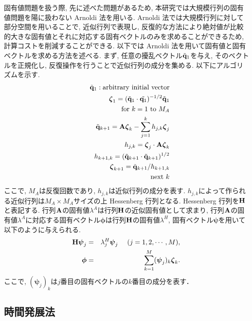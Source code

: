 固有値問題を扱う際,
先に述べた問題があるため,
本研究では大規模行列の固有値問題を陽に扱わない Arnoldi 法を用いる.
Arnoldi 法では大規模行列に対して部分空間を用いることで,
近似行列で表現し,
反復的な方法により絶対値が比較的大きな固有値とそれに対応する固有ベクトルのみを求めることができるため,
計算コストを削減することができる.
以下では Arnoldi 法を用いて固有値と固有ベクトルを求める方法を述べる.
まず,
任意の擾乱ベクトル$\tilde{\bf q}_1$を与え,
そのベクトルを正規化し,
反復操作を行うことで近似行列の成分を集める.
以下にアルゴリズムを示す.
\begin{eqnarray}
  &&\tilde{{\bf q}}_1 : {\rm arbitrary~initial~vector} \nonumber \\ 
  &&{\boldsymbol \zeta}_1=(\tilde{{\bf q}}_1 \cdot \tilde{{\bf q}_1})^{-1/2} \tilde{{\bf q}}_1 \\
  &&{\rm for}~k=1~{\rm to}~M_{A}  \nonumber \\ 
  &&~~\tilde{{\bf q}}_{k+1} = {\bf A}{\mbox {\boldmath $\zeta$}}_k - \sum_{j=1}^k h_{j,k} {\mbox {\boldmath $\zeta$}}_j \\
  &&~~h_{j,k} ={\mbox {\boldmath $\zeta$}}_j \cdot {\bf A}{\mbox {\boldmath $\zeta$}}_k \\
  &&~~h_{k+1,k}=(\tilde{{\bf q}}_{k+1} \cdot \tilde{{\bf q}}_{k+1})^{1/2} \\
  &&~~{\mbox {\boldmath $\zeta$}}_{k+1} =\tilde{{\bf q}}_{k+1}/h_{k+1,k} \\
  &&{\rm next}~k \nonumber
\end{eqnarray}
ここで,
$M_{A}$は反復回数であり,
$h_{j,k}$は近似行列の成分を表す.
$h_{j,k}$によって作られる近似行列は$M_{A}\times M_{A}$サイズの上 Hessenberg 行列となる.
Hessenberg 行列を${\bf H}$と表記する.
行列${\bf A}$の固有値$\lambda^{A}$は行列${\bf H}$の近似固有値として求まり,
行列${\bf A}$の固有値$\lambda^{A}$に対応する固有ベクトル${\boldsymbol \phi}$は行列${\bf H}$の固有値$\lambda^{H}$,
固有ベクトル${\boldsymbol \psi}$を用いて以下のように与えられる.
\begin{eqnarray}
  {\bf H}{\boldsymbol \psi}_j &=& \lambda_{j}^{H}{\boldsymbol \psi}_j ~~~~(j=1,2,\cdots,M), \\
  {\boldsymbol \phi} &=& \sum_{k=1}^M ({\boldsymbol \psi}_j)_k {\boldsymbol \zeta}_k.
\end{eqnarray}
ここで,
$({\boldsymbol \psi}_j)_k$は$j$番目の固有ベクトルの$k$番目の成分を表す．

\subsection*{時間発展法}

